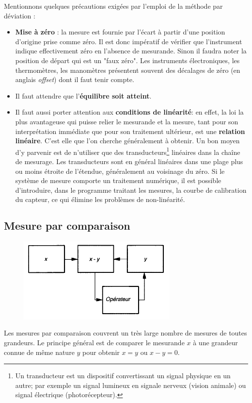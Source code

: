 Mentionnons quelques précautions exigées par l'emploi de la méthode par déviation :
\begin{itemize}
\item\textbf{Mise à zéro} : la mesure est fournie par l'écart à partir d'une position d'origine prise comme zéro. Il est donc impératif de vérifier que l'instrument indique effectivement zéro en l'absence de mesurande. Sinon il faudra noter la position de départ qui est un "faux zéro". Les instruments électroniques, les thermomètres, les manomètres présentent souvent des décalages de zéro (en anglais \textit{offset}) dont il faut tenir compte.
\item Il faut attendre que l'\textbf{équilibre soit atteint}.
\item Il faut aussi porter attention aux \textbf{conditions de linéarité}: en effet, la loi la plus avantageuse qui puisse relier le mesurande et la mesure, tant pour son interprétation immédiate que pour son traitement ultérieur, est une \textbf{relation linéaire}. C'est elle que l'on cherche généralement à obtenir. Un bon moyen d'y parvenir est de n'utiliser que des transducteurs\footnote{Un transducteur est un dispositif convertissant un signal physique en un autre; par exemple un signal lumineux en signale nerveux (vision animale) ou signal électrique (photorécepteur).} linéaires dans la chaîne de mesurage. Les transducteurs sont en général linéaires dans une plage plus ou moins étroite de l'étendue, généralement au voisinage du zéro. Si le système de mesure comporte un traitement numérique, il est possible d'introduire, dans le programme traitant les mesures, la courbe de calibration du capteur, ce qui élimine les problèmes de non-linéarité.
\end{itemize}

\newpage

\subsection{Mesure par comparaison}

\begin{figure}
   \centering
   \includegraphics[width=8cm]{assets/figures/asscomp.pdf}
   \label{fig:asscomp}
\end{figure}
Les mesures par comparaison couvrent un très large nombre de mesures de toutes grandeurs. Le principe général est de comparer le mesurande $x$ à une grandeur connue de même nature $y$ pour obtenir $x=y$ ou $x-y=0$.

